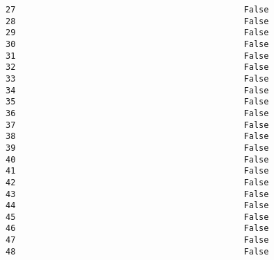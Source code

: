 \documentclass[11pt]{article}
\begin{document}
\begin{Verbatim}[commandchars=\\\{\}]
27                                              False                                    
28                                              False                                    
29                                              False                                    
30                                              False                                    
31                                              False                                    
32                                              False                                    
33                                              False                                    
34                                              False                                    
35                                              False                                    
36                                              False                                    
37                                              False                                    
38                                              False                                    
39                                              False                                    
40                                              False                                    
41                                              False                                    
42                                              False                                    
43                                              False                                    
44                                              False                                    
45                                              False                                    
46                                              False                                    
47                                              False                                    
48                                              False                                    


\end{Verbatim}
\end{document}
